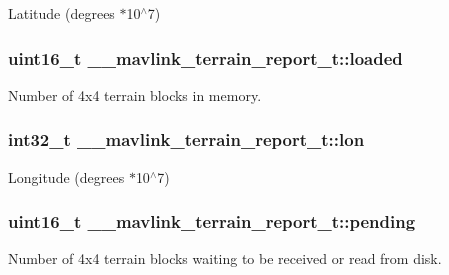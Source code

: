 Latitude (degrees $\ast$10$^\wedge$7) 

\hypertarget{struct____mavlink__terrain__report__t_abc023a29a8389a81af22bfa8c9099c71}{
\subsubsection[{loaded}]{\setlength{\rightskip}{0pt plus 5cm}uint16\+\_\+t \+\_\+\+\_\+mavlink\+\_\+terrain\+\_\+report\+\_\+t\+::loaded}}\label{struct____mavlink__terrain__report__t_abc023a29a8389a81af22bfa8c9099c71}


Number of 4x4 terrain blocks in memory. 

\hypertarget{struct____mavlink__terrain__report__t_ac19c0d14c4da7df455c55c51d52bc30d}{
\subsubsection[{lon}]{\setlength{\rightskip}{0pt plus 5cm}int32\+\_\+t \+\_\+\+\_\+mavlink\+\_\+terrain\+\_\+report\+\_\+t\+::lon}}\label{struct____mavlink__terrain__report__t_ac19c0d14c4da7df455c55c51d52bc30d}


Longitude (degrees $\ast$10$^\wedge$7) 

\hypertarget{struct____mavlink__terrain__report__t_adabec5889b0cb6f5d18b8cf23195ec13}{
\subsubsection[{pending}]{\setlength{\rightskip}{0pt plus 5cm}uint16\+\_\+t \+\_\+\+\_\+mavlink\+\_\+terrain\+\_\+report\+\_\+t\+::pending}}\label{struct____mavlink__terrain__report__t_adabec5889b0cb6f5d18b8cf23195ec13}


Number of 4x4 terrain blocks waiting to be received or read from disk. 

